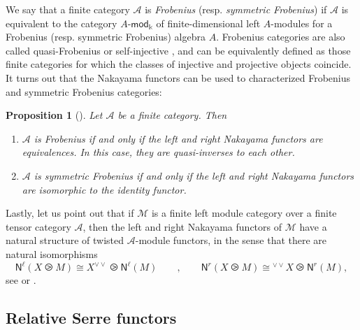 \documentclass[11pt]{article}
\newtheorem{proposition}[theorem]{Proposition}
\theoremstyle{definition}
\begin{document}
We say that a finite category $\mathcal{A}$ is \emph{Frobenius} (resp. \emph{symmetric Frobenius}) if $\mathcal{A}$ is equivalent to the category $A\text{-}\mathsf{mod}_\Bbbk$ of finite-dimensional left $A$-modules for a Frobenius (resp. symmetric Frobenius) algebra $A$. Frobenius categories are also called quasi-Frobenius \cite{egno} or self-injective \cite{fss}, and can be equivalently defined as those finite categories for which the classes of injective and projective objects coincide. It turns out that the Nakayama functors can be used to characterized Frobenius and symmetric Frobenius categories:

\begin{proposition}[{\cite[Proposition 3.24]{fss}}]
Let $\mathcal{A}$ be a finite category. Then
\begin{enumerate}
\item $\mathcal{A}$ is Frobenius if and only if the left and right Nakayama functors are equivalences. In this case, they are quasi-inverses to each other.
\item $\mathcal{A}$ is symmetric Frobenius if and only if the left and right Nakayama functors are isomorphic to the identity functor. 
\end{enumerate}
\end{proposition}


Lastly, let us point out that if $\mathcal{M}$ is a finite left module category over a finite tensor category $\mathcal{A}$, then the left and right Nakayama functors of $\mathcal{M}$ have a natural structure of twisted $\mathcal{A}$-module functors, in the sense that there are natural isomorphisms 
\begin{equation}\label{eq:Nakayama_twisted}
\mathsf{N}^\ell(X \ogreaterthan M) \cong  X^{\vee \vee} 	\ogreaterthan  \mathsf{N}^\ell( M) \qquad , \qquad \mathsf{N}^r(X \ogreaterthan M) \cong  {}^{\vee \vee} X	\ogreaterthan  \mathsf{N}^r( M),
\end{equation}
see \cite[Theorem 4.4]{fss} or \cite[\S 2.5]{relserre}.



\subsection{Relative Serre functors}
\end{document}
